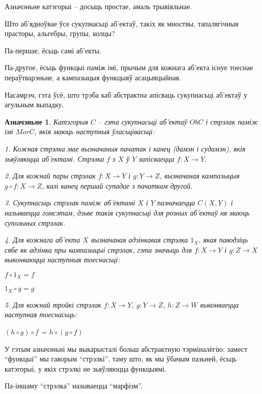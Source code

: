 \documentclass[a4paper,12pt]{book}
\newtheorem{definition}{Азначэньне}[section]
\begin{document}
Азначэньне катэгорыі -- досыць простае, амаль трывіяльнае.

Што аб'ядноўвае ўсе сукупнасьці аб'ектаў, такіх як мноствы,
тапалягічныя прасторы, альгебры, групы, колцы?

Па-першае, ёсьць самі аб'екты.

Па-другое, ёсьць функцыі паміж імі, прычым для кожнага аб'екта існуе
тоеснае пераўтварэньне, а кампазыцыя функцыяў асацыяцыйная.

Насамрэч, гэта ўсё, што трэба каб абстрактна апісваць сукупнасьці
аб'ектаў у агульным выпадку.

\begin{definition}
  Катэгорыя $C$ -- гэта сукупнасьці аб'ектаў ${Ob C}$ і стрэлак паміж
  імі ${Mor C}$, якія  маюць наступныя ўласьцівасьці:

  1. Кожная стрэлка мае вызначаныя пачатак і канец (дамэн і судамэн),
  якія зьяўляюцца аб'ектамі. Стрэлка $f$ з $X$ ў $Y$ запісваецца
  ${f:X\rightarrow Y}$.

  2. Для кожнай пары стрэлак ${f:X\rightarrow Y}$ і ${g:Y\rightarrow
    Z}$, вызначаная кампазыцыя ${g \circ f:X\rightarrow Z}$, калі канец першай
  супадае з пачаткам другой.

  3. Сукупнасьць стрэлак паміж аб'ектамі $X$ і $Y$ пазначаецца
  $C(X,Y)$ і называецца гомсэтам, дзьве такія сукупнасьці для розных аб'ектаў ня маюць
  супольных стрэлак.

  4. Для кожнага аб'екта $X$ вызначаная адзінкавая стрэлка $1_X$, якая
  паводзіць сябе як адзінка пры кампазыцыі стрэлак, гэта значыць для
  ${f:X \rightarrow Y}$ і ${g:Z\rightarrow X}$ выконваюцца наступныя
  тоеснасьці:

  $f \circ 1_X = f$

  $1_X \circ g = g$

  5. Для кожнай тройкі стрэлак ${f: X\rightarrow Y}$, ${g:Y\rightarrow
    Z}$, ${h:Z\rightarrow W}$ выконваецца наступная тоеснасьць:

  $(h \circ g) \circ f$ = $h \circ (g \circ f)$
\end{definition}

У гэтым азначэньні мы выкарысталі больш абстрактную тэрміналёгію:
замест ``функцыі'' мы гаворым ``стрэлкі'', таму што, як мы ўбачым
пазьней, ёсьць катэгорыі, у якіх стрэлкі не зьяўляюцца функцыямі.

Па-іншаму ``стрэлка'' называецца ``марфізм''.
\end{document}
